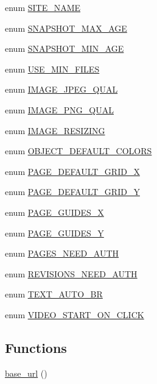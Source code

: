 \begin{CompactItemize}
enum \hyperlink{config_8inc_8php_38f8e1265350d7091b55f4cffe629f3a}{SITE\_\-NAME} 
\item 
enum \hyperlink{config_8inc_8php_a9c8d739795b1000f6ea105992a4e488}{SNAPSHOT\_\-MAX\_\-AGE} 
\item 
enum \hyperlink{config_8inc_8php_7fb94ff6aaa61e964fe2f90f738d5cb3}{SNAPSHOT\_\-MIN\_\-AGE} 
\item 
enum \hyperlink{config_8inc_8php_98806af9de0ea41a958d26c7e06b26a9}{USE\_\-MIN\_\-FILES} 
\item 
enum \hyperlink{config_8inc_8php_f27e0280ef96e9b1d2d968a0d2d208ff}{IMAGE\_\-JPEG\_\-QUAL} 
\item 
enum \hyperlink{config_8inc_8php_3e161cc5c717f2e23d89b69ec297af9b}{IMAGE\_\-PNG\_\-QUAL} 
\item 
enum \hyperlink{config_8inc_8php_0654894e46ca07417a6e85e091ed7d1d}{IMAGE\_\-RESIZING} 
\item 
enum \hyperlink{config_8inc_8php_3e205a45d91d7ef191e53487b6b48b3b}{OBJECT\_\-DEFAULT\_\-COLORS} 
\item 
enum \hyperlink{config_8inc_8php_bc1c54acdbce897c718854b663517cf9}{PAGE\_\-DEFAULT\_\-GRID\_\-X} 
\item 
enum \hyperlink{config_8inc_8php_b93c5dcea5ef58747b80594c3d9304d7}{PAGE\_\-DEFAULT\_\-GRID\_\-Y} 
\item 
enum \hyperlink{config_8inc_8php_81167deb206874270a59273141919fe5}{PAGE\_\-GUIDES\_\-X} 
\item 
enum \hyperlink{config_8inc_8php_3f78eb981e05f649bfff403c0e595d0b}{PAGE\_\-GUIDES\_\-Y} 
\item 
enum \hyperlink{config_8inc_8php_11f5534165e1764860b16cc7215b2141}{PAGES\_\-NEED\_\-AUTH} 
\item 
enum \hyperlink{config_8inc_8php_67b9479d334a4e6c33c0bc3505b3eb5e}{REVISIONS\_\-NEED\_\-AUTH} 
\item 
enum \hyperlink{config_8inc_8php_6f581226f389510394c592491ebedc0b}{TEXT\_\-AUTO\_\-BR} 
\item 
enum \hyperlink{config_8inc_8php_e1e42e1baa41f003453356a3747f9fee}{VIDEO\_\-START\_\-ON\_\-CLICK} 
\end{CompactItemize}
\subsection*{Functions}
\begin{CompactItemize}
\item 
\hyperlink{config_8inc_8php_8fdfb46e432b25bbdad23971a23a26b5}{base\_\-url} ()
\end{CompactItemize}


